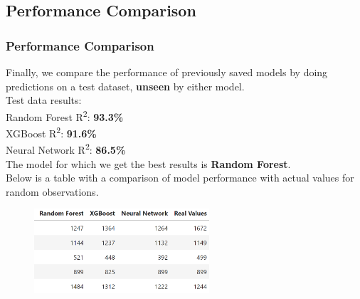 \documentclass[8pt]{beamer}
\begin{document}
\subsection{Performance Comparison}
\begin{frame}
\frametitle{Performance Comparison}
Finally, we compare the performance of previously saved models by doing predictions on a test dataset, \textbf{unseen} by either model.\\
\vspace{2mm}
Test data results:\\
Random Forest R\textsuperscript{2}: \textbf{93.3\%}\\
XGBoost R\textsuperscript{2}: \textbf{91.6\%}\\
Neural Network R\textsuperscript{2}: \textbf{86.5\%}\\
\vspace{2mm}
The model for which we get the best results is \textbf{Random Forest}.\\
\vspace{2mm}
Below is a table with a comparison of model performance with actual values for random observations.
\begin{figure}[t]
\includegraphics[width=6.5cm]{regression_final_performance_table.png}
\centering
\end{figure}
\end{frame}
\end{document}
